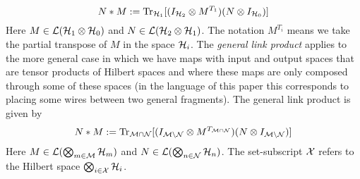 \documentclass[10pt]{article}
\begin{document}
\begin{equation}\label{linkproduct}
N * M := \text{Tr}_{{\cal H}_1} [( I_{{\cal H}_2} \otimes M^{T_1} )(N\otimes I_{{\cal H}_0}) ]
\end{equation}
Here $M\in {\cal L}({\cal H}_1 \otimes {\cal H}_0)$ and $N\in {\cal L}({\cal H}_2 \otimes {\cal H}_1)$.  The notation $M^{T_i}$ means we take the partial transpose of $M$ in the space ${\cal H}_i$.  The \emph{general link product} applies to the more general case in which we have maps with input and output spaces that are tensor products of Hilbert spaces and where these maps are only composed through some of these spaces (in the language of this paper this corresponds to placing some wires between two general fragments).  The general link product is given by
\begin{equation}\label{generallinkproduct}
N * M :=  \text{Tr}_{{\cal M}\cap {\cal N}}
[( I_{{\cal M} \backslash {\cal N}} \otimes M^{T_{{\cal M}\cap {\cal N}}} )(N\otimes I_{{\cal M}\backslash{\cal N}}) ]
\end{equation}
Here $M\in {\cal L}(\bigotimes_{m\in{\cal M}} {\cal H}_m)$ and $N\in {\cal L}(\bigotimes_{n\in{\cal N}} {\cal H}_n)$.   The set-subscript ${\cal X}$ refers to the Hilbert space $\bigotimes_{i\in {\cal X}} {\cal H}_i$.
\end{document}
